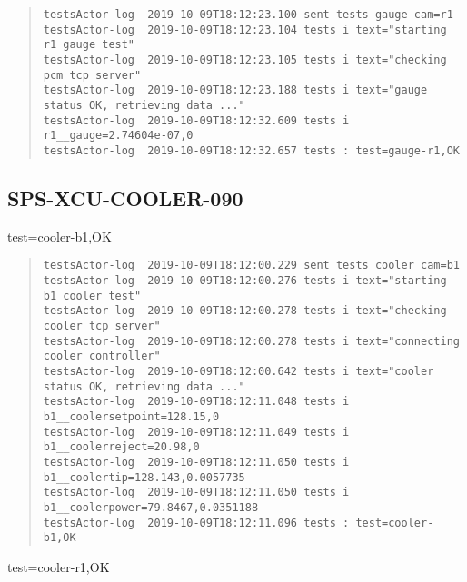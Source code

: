 \begin{quote}
\begin{tiny}
\begin{verbatim}
testsActor-log  2019-10-09T18:12:23.100 sent tests gauge cam=r1
testsActor-log  2019-10-09T18:12:23.104 tests i text="starting r1 gauge test"
testsActor-log  2019-10-09T18:12:23.105 tests i text="checking pcm tcp server"
testsActor-log  2019-10-09T18:12:23.188 tests i text="gauge status OK, retrieving data ..."
testsActor-log  2019-10-09T18:12:32.609 tests i r1__gauge=2.74604e-07,0
testsActor-log  2019-10-09T18:12:32.657 tests : test=gauge-r1,OK
\end{verbatim}
\end{tiny}
\end{quote}

\subsection{SPS-XCU-COOLER-090}
\label{sec:tc-090}

test=cooler-b1,OK

\begin{quote}
\begin{tiny}
\begin{verbatim}
testsActor-log  2019-10-09T18:12:00.229 sent tests cooler cam=b1
testsActor-log  2019-10-09T18:12:00.276 tests i text="starting b1 cooler test"
testsActor-log  2019-10-09T18:12:00.278 tests i text="checking cooler tcp server"
testsActor-log  2019-10-09T18:12:00.278 tests i text="connecting cooler controller"
testsActor-log  2019-10-09T18:12:00.642 tests i text="cooler status OK, retrieving data ..."
testsActor-log  2019-10-09T18:12:11.048 tests i b1__coolersetpoint=128.15,0
testsActor-log  2019-10-09T18:12:11.049 tests i b1__coolerreject=20.98,0
testsActor-log  2019-10-09T18:12:11.050 tests i b1__coolertip=128.143,0.0057735
testsActor-log  2019-10-09T18:12:11.050 tests i b1__coolerpower=79.8467,0.0351188
testsActor-log  2019-10-09T18:12:11.096 tests : test=cooler-b1,OK
\end{verbatim}
\end{tiny}
\end{quote}

\noindent test=cooler-r1,OK

